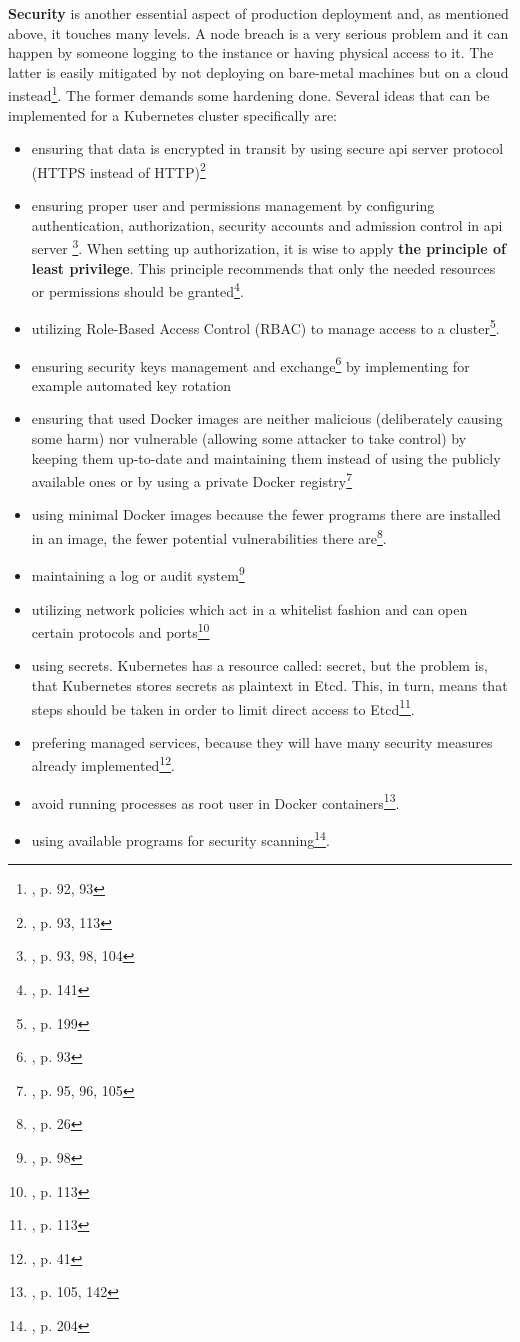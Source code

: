 \begin{itemize}
\textbf{Security} is another essential aspect of production deployment and, as mentioned above, it touches many levels. A node breach is a very serious problem and it can happen by someone logging to the instance or having physical access to it. The latter is easily mitigated by not deploying on bare-metal machines but on a cloud instead\footnote{\cite{book-mastering-k8s}, p. 92, 93}. The former demands some hardening done. Several ideas that can be implemented for a Kubernetes cluster specifically are:
\begin{itemize}
\item ensuring that data is encrypted in transit by using secure api server protocol (HTTPS instead of HTTP)\footnote{\cite{book-mastering-k8s}, p. 93, 113}
\item ensuring proper user and permissions management by configuring authentication, authorization, security accounts and admission control in api server \footnote{\cite{book-mastering-k8s}, p. 93, 98, 104}. When setting up authorization, it is wise to apply \textbf{the principle of least privilege}. This principle recommends that only the needed resources or permissions should be granted\footnote{\cite{book-cndwk}, p. 141}.
\item utilizing Role-Based Access Control (RBAC) to manage access to a cluster\footnote{\cite{book-cndwk}, p. 199}.
\item ensuring security keys management and exchange\footnote{\cite{book-mastering-k8s}, p. 93} by implementing for example automated key rotation
\item ensuring that used Docker images are neither malicious (deliberately causing some harm) nor vulnerable (allowing some attacker to take control) by keeping them up-to-date and maintaining them instead of using the publicly available ones or by using a private Docker registry\footnote{\cite{book-mastering-k8s}, p. 95, 96, 105}
\item using minimal Docker images because the fewer programs there are installed in an image, the fewer potential vulnerabilities there are\footnote{\cite{book-cndwk}, p. 26}.
\item maintaining a log or audit system\footnote{\cite{book-mastering-k8s}, p. 98}
\item utilizing network policies which act in a whitelist fashion and can open certain protocols and ports\footnote{\cite{book-mastering-k8s}, p. 113}
\item using secrets. Kubernetes has a resource called: secret, but the problem is, that Kubernetes stores secrets as plaintext in Etcd. This, in turn, means that steps should be taken in order to limit direct access to Etcd\footnote{\cite{book-mastering-k8s}, p. 113}.
\item prefering managed services, because they will have many security measures already implemented\footnote{\cite{book-cndwk}, p. 41}.
\item avoid running processes as root user in Docker containers\footnote{\cite{book-cndwk}, p. 105, 142}.
\item using available programs for security scanning\footnote{\cite{book-cndwk}, p. 204}.
\end{itemize}


\end{itemize}
